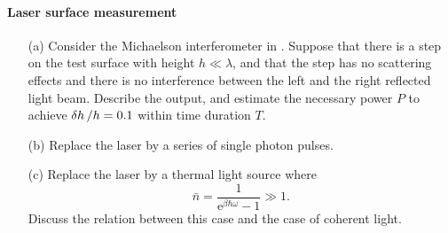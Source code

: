\documentclass[hyperref, a4paper]{article}
\newcommand*{\ee}{\mathrm{e}}
\begin{document}
\paragraph{Laser surface measurement} \begin{itemize}
\item[(a)] Consider the Michaelson interferometer in .
Suppose that there is a step on the test surface with height $h \ll \lambda$, and that the step has no
scattering effects and there is no interference between the left and the right reflected light beam.
Describe the output, and estimate the necessary power $P$ to achieve $\var{h} / h = 0.1$ 
within time duration $T$.
\item[(b)] Replace the laser by a series of single photon pulses.
\item[(c)] Replace the laser by a thermal light source where 
\begin{equation}
    \bar{n} = \frac{1}{\ee^{\beta \hbar \omega} - 1} \gg 1.
\end{equation}
Discuss the relation between this case and the case of coherent light.
\end{itemize}
\end{document}
